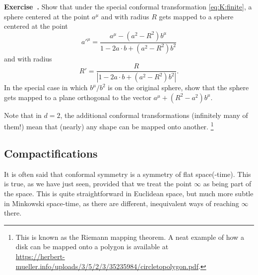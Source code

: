 \documentclass[a4paper,12pt]{article}
\numberwithin{equation}{section}
\newcounter{exercise}[section]
\newenvironment{exercise}[1][]%
	{\refstepcounter{exercise}\bigskip
	\begin{mdframed}[backgroundcolor=gray!20, linewidth=0]
	\noindent\textbf{Exercise~\thesection.\theexercise #1} \rmfamily}
  	{\end{mdframed}\bigskip}
\begin{document}
\begin{exercise}
	Show that under the special conformal transformation \eqref{eq:K:finite}, a sphere centered at the point $a^\mu$ and with radius $R$ gets mapped to a sphere centered at the point 
	$$
	a'^\mu = \frac{a^\mu - (a^2 - R^2) b^\mu}
	{1 - 2 a \cdot b + (a^2 - R^2) b^2}
	$$
	and with radius
	$$
	R' = \frac{R}{\left| 1 - 2 a \cdot b + (a^2 - R^2) b^2 \right|}.
	$$
	In the special case in which $b^\mu / b^2$ is on the original sphere, show that the sphere gets mapped to a plane orthogonal to the vector $a^\mu + (R^2 - a^2) b^\mu$.
	
\end{exercise}

Note that in $d = 2$, the additional conformal transformations (infinitely many of them!) mean that (nearly) any shape can be mapped onto another.%
%
\footnote{This is known as the Riemann mapping theorem. A neat example of how a disk can be mapped onto a polygon is available at \\
\url{https://herbert-mueller.info/uploads/3/5/2/3/35235984/circletopolygon.pdf}.}


\subsection{Compactifications}

It is often said that conformal symmetry is a symmetry of flat space(-time).
This is true, as we have just seen, provided that we treat the point $\infty$ as being part of the space.
This is quite straightforward in Euclidean space, but much more subtle in Minkowski space-time, as there are different, inequivalent ways of reaching $\infty$ there.
\end{document}
